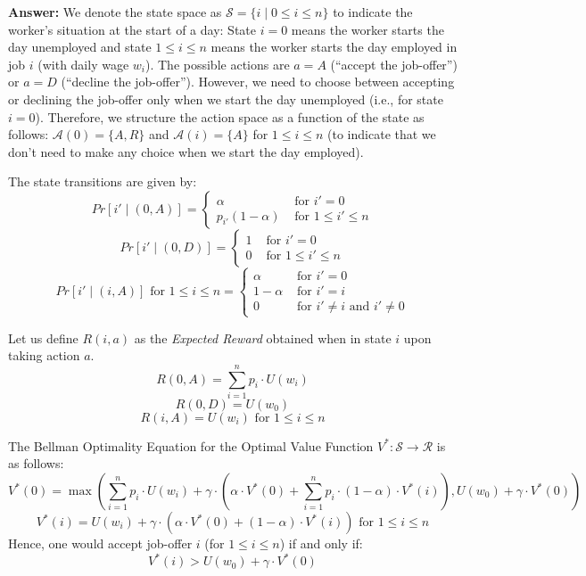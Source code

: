 \documentclass[12pt]{exam}
\begin{document}
\begin{questions}
\begin{itemize}
{\bf Answer: } We denote the state space as $\mathcal{S} = \{i \mid 0 \leq i \leq n\}$ to indicate the worker's situation at the start of a day: State $i = 0$ means the worker starts the day unemployed and state $1 \leq i \leq n$ means the worker starts the day employed in job $i$ (with daily wage $w_i$). The possible actions are $a=A$ (``accept the job-offer'') or $a=D$ (``decline the job-offer''). However, we need to choose between accepting or declining the job-offer only when we start the day unemployed (i.e., for state $i=0$). Therefore, we structure the action space as a function of the state as follows: $\mathcal{A}(0) = \{A,R\}$ and $\mathcal{A}(i) = \{A\}$ for $1 \leq i \leq n$ (to indicate that we don't need to make any choice when we start the day employed).

The state transitions are given by:
$$
Pr[i' \mid (0, A)] =
\begin{cases}
\alpha & \text{ for } i' = 0 \\
p_{i'}(1-\alpha) & \text{ for } 1 \leq i' \leq n
\end{cases}
$$
$$
Pr[i' \mid (0, D)] =
\begin{cases}
1 & \text{ for } i' = 0\\
0 & \text{ for } 1 \leq i' \leq n
\end{cases}
$$
$$
Pr[i' \mid (i, A)] \text{ for } 1 \leq i \leq n =
\begin{cases}
\alpha & \text{ for } i' = 0 \\
1-\alpha & \text{ for } i' = i\\
0 & \text{ for } i' \neq i \text{ and } i' \neq 0
\end{cases}
$$

Let us define $R(i, a)$ as the {\em Expected Reward} obtained when in state $i$ upon taking action $a$.
$$R(0,A) = \sum_{i=1}^n p_i \cdot U(w_i)$$
$$R(0,D) = U(w_0)$$
$$R(i,A) = U(w_i) \text{ for } 1 \leq i \leq n$$

The Bellman Optimality Equation for the Optimal Value Function $V^* : \mathcal{S} \rightarrow \mathcal{R}$ is as follows:
$$V^*(0) = \max(\sum_{i=1}^n p_i \cdot U(w_i) + \gamma \cdot (\alpha \cdot V^*(0) + \sum_{i=1}^n p_i \cdot (1 - \alpha) \cdot V^*(i)), U(w_0) + \gamma \cdot V^*(0))$$
$$V^*(i) = U(w_i) + \gamma \cdot (\alpha \cdot V^*(0) + (1 - \alpha) \cdot V^*(i)) \text{ for } 1 \leq i \leq n$$
Hence, one would accept job-offer $i$ (for $1 \leq i \leq n$) if and only if:
$$V^*(i) > U(w_0) + \gamma \cdot V^*(0)$$


\end{itemize}
\end{questions}
\end{document}
